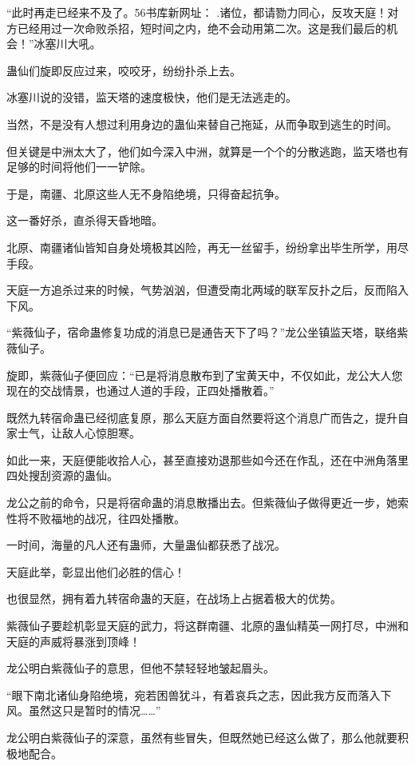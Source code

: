 
\begin{this_body}

“此时再走已经来不及了。56书库新网址： .诸位，都请勠力同心，反攻天庭！对方已经用过一次命败杀招，短时间之内，绝不会动用第二次。这是我们最后的机会！”冰塞川大吼。

蛊仙们旋即反应过来，咬咬牙，纷纷扑杀上去。

冰塞川说的没错，监天塔的速度极快，他们是无法逃走的。

当然，不是没有人想过利用身边的蛊仙来替自己拖延，从而争取到逃生的时间。

但关键是中洲太大了，他们如今深入中洲，就算是一个个的分散逃跑，监天塔也有足够的时间将他们一一铲除。

于是，南疆、北原这些人无不身陷绝境，只得奋起抗争。

这一番好杀，直杀得天昏地暗。

北原、南疆诸仙皆知自身处境极其凶险，再无一丝留手，纷纷拿出毕生所学，用尽手段。

天庭一方追杀过来的时候，气势汹汹，但遭受南北两域的联军反扑之后，反而陷入下风。

“紫薇仙子，宿命蛊修复功成的消息已是通告天下了吗？”龙公坐镇监天塔，联络紫薇仙子。

旋即，紫薇仙子便回应：“已是将消息散布到了宝黄天中，不仅如此，龙公大人您现在的交战情景，也通过人道的手段，正四处播散着。”

既然九转宿命蛊已经彻底复原，那么天庭方面自然要将这个消息广而告之，提升自家士气，让敌人心惊胆寒。

如此一来，天庭便能收拾人心，甚至直接劝退那些如今还在作乱，还在中洲角落里四处搜刮资源的蛊仙。

龙公之前的命令，只是将宿命蛊的消息散播出去。但紫薇仙子做得更近一步，她索性将不败福地的战况，往四处播散。

一时间，海量的凡人还有蛊师，大量蛊仙都获悉了战况。

天庭此举，彰显出他们必胜的信心！

也很显然，拥有着九转宿命蛊的天庭，在战场上占据着极大的优势。

紫薇仙子要趁机彰显天庭的武力，将这群南疆、北原的蛊仙精英一网打尽，中洲和天庭的声威将暴涨到顶峰！

龙公明白紫薇仙子的意思，但他不禁轻轻地皱起眉头。

“眼下南北诸仙身陷绝境，宛若困兽犹斗，有着哀兵之志，因此我方反而落入下风。虽然这只是暂时的情况……”

龙公明白紫薇仙子的深意，虽然有些冒失，但既然她已经这么做了，那么他就要积极地配合。


\end{this_body}

